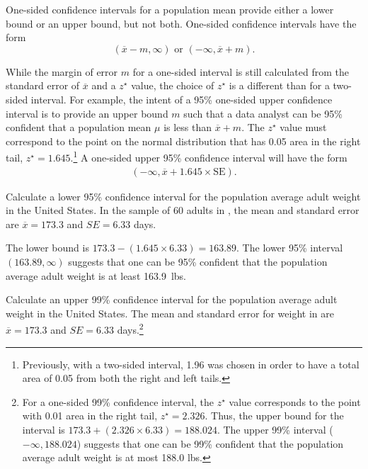 One-sided confidence intervals for a population mean provide either a lower bound or an upper bound, but not both.  One-sided confidence intervals have the form
\[
(\overline{x} - m, \infty) \text{ or } (-\infty, \overline{x} + m).
\]

While the margin of error $m$ for a one-sided interval is still calculated from the standard error of $\overline{x}$ and a $z^\star$ value, the choice of $z^\star$ is a different than for a two-sided interval. For example, the intent of a 95\% one-sided upper confidence interval is to provide an upper bound $m$ such that a data analyst can be 95\% confident that a population mean $\mu$ is less than $\overline{x} + m$. The $z^\star$ value must correspond to the point on the normal distribution that has 0.05 area in the right tail, $z^{\star} = 1.645$.\footnote{Previously, with a two-sided interval, 1.96 was chosen in order to have a total area of 0.05 from both the right and left tails.} A one-sided upper 95\%  confidence interval will have the form
\begin{align*}
(-\infty, \overline{x} + 1.645 \times \text{SE}).
\end{align*}

\begin{example}
  {Calculate a lower 95\% confidence interval for the population average adult weight in the United States. In the sample of 60 adults in , the mean and standard error are $\overline{x} = 173.3$ and $SE = 6.33$ days.}
	
The lower bound is $173.3 - (1.645 \times 6.33) = 163.89$. The lower 95\% interval $(163.89, \infty)$ suggests that one can be 95\% confident that the population average adult weight is at least 163.9~lbs. 
\end{example}

\begin{exercise} Calculate an upper 99\% confidence interval for the population average adult weight in the United States. The mean and standard error for weight in  are $\overline{x} = 173.3$ and $SE = 6.33$ days.\footnote{For a one-sided 99\% confidence interval, the $z^\star$ value corresponds to the point with 0.01 area in the right tail, $z^\star = 2.326$. Thus, the upper bound for the interval is $173.3 + (2.326 \times 6.33) = 188.024.$ The upper 99\% interval ($-\infty, 188.024$) suggests that one can be 99\% confident that the population average adult weight is at most 188.0 lbs.}
	
\end{exercise}

